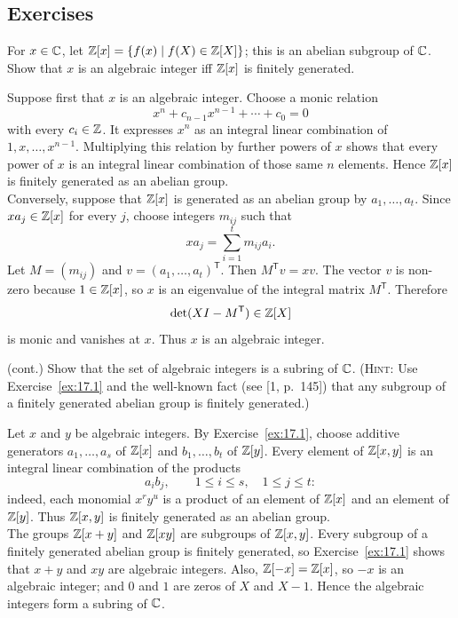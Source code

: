 \documentclass[../Odyssey_Project.tex]{subfiles}
\begin{document}
\subsection*{Exercises}

\begin{exercise}
\label{ex:17.1}
For $x \in \mathbb{C}$, let $\mathbb{Z}[x] = \{f(x) \mid f(X) \in \mathbb{Z}[X]\}$; this is an abelian subgroup of $\mathbb{C}$. Show that $x$ is an algebraic integer iff $\mathbb{Z}[x]$ is finitely generated.
\end{exercise}
\begin{solution}
    Suppose first that $x$ is an algebraic integer. Choose a monic relation
    \[
        x^n+c_{n-1}x^{n-1}+\cdots+c_0=0
    \]
    with every $c_i\in\mathbb{Z}$. It expresses $x^n$ as an integral linear combination of $1,x,\ldots,x^{n-1}$. Multiplying this relation by further powers of $x$ shows that every power of $x$ is an integral linear combination of those same $n$ elements. Hence $\mathbb{Z}[x]$ is finitely generated as an abelian group.\\
    Conversely, suppose that $\mathbb{Z}[x]$ is generated as an abelian group by $a_1,\ldots,a_t$. Since $xa_j\in\mathbb{Z}[x]$ for every $j$, choose integers $m_{ij}$ such that
    \[
        xa_j=\sum_{i=1}^{t}m_{ij}a_i.
    \]
    Let $M=(m_{ij})$ and $v=(a_1,\ldots,a_t)^{\mathsf{T}}$. Then $M^{\mathsf{T}}v=xv$. The vector $v$ is non-zero because $1\in\mathbb{Z}[x]$, so $x$ is an eigenvalue of the integral matrix $M^{\mathsf{T}}$. Therefore
    \[
        \det(XI-M^{\mathsf{T}})\in\mathbb{Z}[X]
    \]
    is monic and vanishes at $x$. Thus $x$ is an algebraic integer.
\end{solution}

\begin{exercise}
\label{ex:17.2}
(cont.) Show that the set of algebraic integers is a subring of $\mathbb{C}$. (\textsc{Hint}: Use Exercise~\ref{ex:17.1} and the well-known fact (see [1, p.~145]) that any subgroup of a finitely generated abelian group is finitely generated.)
\end{exercise}
\begin{solution}
    Let $x$ and $y$ be algebraic integers. By Exercise~\ref{ex:17.1}, choose additive generators $a_1,\ldots,a_s$ of $\mathbb{Z}[x]$ and $b_1,\ldots,b_t$ of $\mathbb{Z}[y]$. Every element of $\mathbb{Z}[x,y]$ is an integral linear combination of the products
    \[
        a_i b_j,\qquad 1\leq i\leq s,\quad 1\leq j\leq t:
    \]
    indeed, each monomial $x^r y^u$ is a product of an element of $\mathbb{Z}[x]$ and an element of $\mathbb{Z}[y]$. Thus $\mathbb{Z}[x,y]$ is finitely generated as an abelian group.\\
    The groups $\mathbb{Z}[x+y]$ and $\mathbb{Z}[xy]$ are subgroups of $\mathbb{Z}[x,y]$. Every subgroup of a finitely generated abelian group is finitely generated, so Exercise~\ref{ex:17.1} shows that $x+y$ and $xy$ are algebraic integers. Also, $\mathbb{Z}[-x]=\mathbb{Z}[x]$, so $-x$ is an algebraic integer; and $0$ and $1$ are zeros of $X$ and $X-1$. Hence the algebraic integers form a subring of $\mathbb{C}$.
\end{solution}
\end{document}
